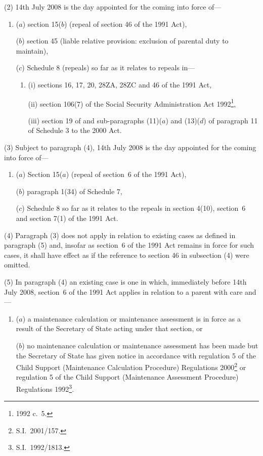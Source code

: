 \documentclass[12pt,a4paper]{article}
\begin{document}
(2) 14th July 2008 is the day appointed for the coming into force of—
\begin{enumerate}\item[]
($a$) section 15($b$)  (repeal of section 46 of the 1991 Act),

($b$) section 45 (liable relative provision: exclusion of parental duty to maintain),

($c$) Schedule 8 (repeals) so far as it relates to repeals in—
\begin{enumerate}\item[]
(i) sections 16, 17, 20, 28ZA, 28ZC and 46 of the 1991 Act,

(ii) section 106(7) of the Social Security Administration Act 1992\footnote{1992 c.~5.},

(iii) section 19 of and sub-paragraphs (11)($a$)  and (13)($d$)  of paragraph 11 of Schedule 3 to the 2000 Act.
\end{enumerate}
\end{enumerate}

(3) Subject to paragraph (4), 14th July 2008 is the day appointed for the coming into force of—
\begin{enumerate}\item[]
($a$) Section 15($a$)  (repeal of section~6 of the 1991 Act),

($b$) paragraph 1(34) of Schedule 7,

($c$) Schedule 8 so far as it relates to the repeals in section 4(10), section~6 and section 7(1) of the 1991 Act.
\end{enumerate}

(4) Paragraph (3) does not apply in relation to existing cases as defined in paragraph (5) and, insofar as section~6 of the 1991 Act remains in force for such cases, it shall have effect as if the reference to section 46 in subsection (4) were omitted.

(5) In paragraph (4) an existing case is one in which, immediately before 14th July 2008, section~6 of the 1991 Act applies in relation to a parent with care and—
\begin{enumerate}\item[]
($a$) a maintenance calculation or maintenance assessment is in force as a result of the Secretary of State acting under that section, or

($b$) no maintenance calculation or maintenance assessment has been made but the Secretary of State has given notice in accordance with regulation 5 of the Child Support (Maintenance Calculation Procedure) Regulations 2000\footnote{S.I.~2001/157.} or regulation 5 of the Child Support (Maintenance Assessment Procedure) Regulations 1992\footnote{S.I.~1992/1813.}.
\end{enumerate}
\end{document}
